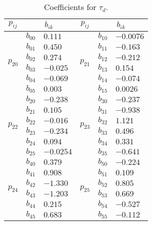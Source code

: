 %
\begin{table}[tb]
	\centering
	\caption{Coefficients for $\tau_d$.}
	\label{T:td}
	\begin{tabular}{@{}cll|cll@{}}
		\hline
		$p_{ij}$                  & \multicolumn{2}{c}{$b_{ik}$} & $p_{ij}$ & \multicolumn{2}{c}{$b_{ik}$}\\
		\hline
		\multirow{6}{*}{$p_{20}$} & $b_{00}$  & $0.111$
		&   \multirow{6}{*}{$p_{21}$} & $b_{10}$ & $-0.0076$
		\\ %
		& $b_{01}$      & $0.450$   &  	& $b_{11}$      & $-0.163$ \\ %
		& $b_{02}$      & $0.274$   &	& $b_{12}$      & $-0.212$ \\ %
		& $b_{03}$      & $-0.025$   &	& $b_{13}$      & $0.154$ \\ %
		& $b_{04}$      & $-0.069$  & 	& $b_{14}$      & $-0.074$  \\ %
		& $b_{05}$      & $0.003$   &	& $b_{15}$      & $0.0026$    \\ \hline
		\multirow{6}{*}{$p_{22}$} & $b_{20}$  & $-0.238$	& \multirow{6}{*}{$p_{23}$} & $b_{30}$ & $-0.237$ \\ %
		& $b_{21}$      & $0.105$   & & $b_{31}$      & $-0.938$  \\ %
		& $b_{22}$      & $-0.016$   & & $b_{32}$      & $1.121$  \\ %
		& $b_{23}$      & $-0.234$    & & $b_{33}$      & $0.496$   \\ %
		& $b_{24}$      & $0.094$  & & $b_{34}$      & $0.331$  \\ %
		& $b_{25}$      & $-0.0254$   & & $b_{35}$      & $-0.641$  \\ \hline
		\multirow{6}{*}{$p_{24}$} & $b_{40}$      & $0.379$  & \multirow{6}{*}{$p_{25}$} & $b_{50}$      & $-0.224$   \\ %
		& $b_{41}$      & $0.908$     &  & $b_{51}$      & $0.109$\\ %
		& $b_{42}$      & $-1.330$     &  & $b_{52}$      & $0.805$\\ %
		& $b_{43}$      & $-1.203$    &  & $b_{53}$      & $0.669$\\ %
		& $b_{44}$      & $0.215$     &  & $b_{54}$      & $-0.527$\\ %
		& $b_{45}$      & $0.683$   &  & $b_{55}$      & $-0.112$\\
		\hline
	\end{tabular}
\end{table}
